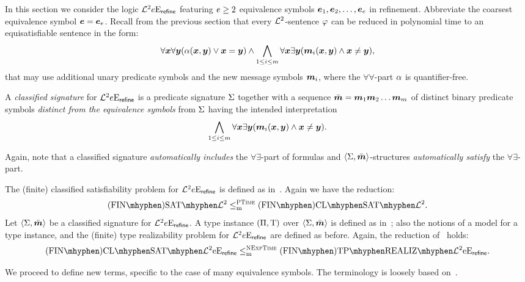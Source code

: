 In this section we consider the logic $\mathcal{L}^{2}_{{}}{e}\mathrm{E}_{\mathsf{refine}}$
featuring $e \geq 2$ equivalence symbols $\bm{e}_{1},\bm{e}_{2},\dots,\bm{e}_{e}$ in
refinement. Abbreviate the coarsest equivalence symbol $\bm{e} = \bm{e}_{e}$.
Recall from the previous section that every $\mathcal{L}^{2}$-sentence $\varphi$ can be
reduced in polynomial time to an equisatisfiable sentence in the form:
\begin{equation*}
  \forall\bm{x}\forall\bm{y} (\alpha(\bm{x},\bm{y}) \lor \bm{x} = \bm{y}) \land
  \bigwedge_{1 \leq i \leq m} \forall\bm{x}\exists\bm{y}
  (\bm{m}_{i}(\bm{x},\bm{y}) \land \bm{x} \neq \bm{y}),
\end{equation*}
that may use additional unary predicate symbols and the new message symbols
$\bm{m}_{i}$, where the $\forall\forall$-part $\alpha$ is quantifier-free.
\begin{definition}
A \emph{classified signature} for $\mathcal{L}^{2}_{{}}{e}\mathrm{E}_{\mathsf{refine}}$ is a
predicate signature $\mathrm{\Sigma}$ together with a sequence $\sms =
\smm1\smm2\dots\smm\nm$ of distinct binary predicate symbols \emph{distinct
from the equivalence symbols} from $\mathrm{\Sigma}$ having the intended interpretation
\begin{equation*}
  \bigwedge_{1 \leq i \leq m} \forall\bm{x}\exists\bm{y} 
  (\bm{m}_{i}(\bm{x},\bm{y}) \land \bm{x} \neq \bm{y}).
\end{equation*}
\end{definition}
Again, note that a classified signature \emph{automatically includes} the
$\forall\exists$-part of formulas and $\left\langle \mathrm{\Sigma},\bar{\bm{m}} \right\rangle$-structures
\emph{automatically satisfy} the $\forall\exists$-part.

The (finite) classified satisfiability problem for
$\mathcal{L}^{2}_{{}}{e}\mathrm{E}_{\mathsf{refine}}$ is defined as in~.
Again we have the reduction:
\[
  \FinASat{\vFo2} \red\cP \FinAClSat{\vFo2}.
\]
Let $\left\langle \mathrm{\Sigma},\bar{\bm{m}} \right\rangle$ be a classified signature for
$\mathcal{L}^{2}_{{}}{e}\mathrm{E}_{\mathsf{refine}}$.
A type instance $(\Pi,\mathrm{T})$ over $\left\langle \mathrm{\Sigma},\bar{\bm{m}} \right\rangle$ is defined as
in~; also the notions of a model for a type instance,
and the (finite) type realizability problem for
$\mathcal{L}^{2}_{{}}{e}\mathrm{E}_{\mathsf{refine}}$ are defined as before. 
Again, the reduction of~ holds:
\[
  \FinAClSat{\Lvp\Fo2\nopow\Eea\sze\agrefine} \red\cNExpTime
  \FinAReal{\Lvp\Fo2\nopow\Eea\sze\agrefine}.
\]

We proceed to define new terms, specific to the case of many equivalence
symbols.
The terminology is loosely based on~\cite{MALQ:MALQ201400102}.

